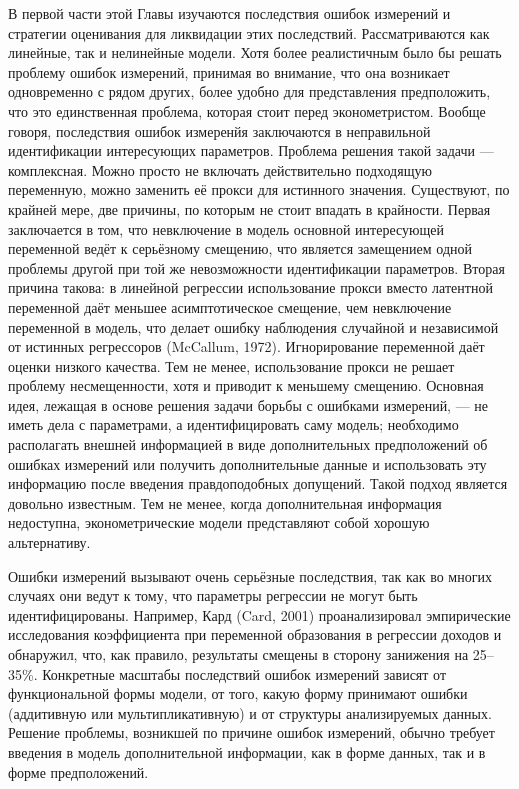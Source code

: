 В первой части этой Главы изучаются последствия ошибок измерений и стратегии оценивания для ликвидации этих последствий. Рассматриваются как линейные, так и нелинейные модели. Хотя более реалистичным было бы решать проблему ошибок измерений, принимая во внимание, что она возникает одновременно с рядом других, более удобно для представления предположить, что это единственная проблема, которая стоит перед эконометристом.
Вообще говоря, последствия ошибок измеренйя заключаются в неправильной идентификации интересующих параметров. Проблема решения такой задачи --- комплексная. Можно просто не включать действительно подходящую переменную, можно заменить её прокси для истинного значения. Существуют, по крайней мере, две причины, по которым не стоит впадать в крайности. Первая заключается в том, что невключение в модель основной интересующей переменной ведёт к серьёзному смещению, что является замещением одной проблемы другой при той же невозможности идентификации параметров. Вторая причина такова: в линейной регрессии использование прокси вместо латентной переменной даёт меньшее асимптотическое смещение, чем невключение переменной в модель, что делает ошибку наблюдения случайной и независимой от истинных регрессоров (McCallum, 1972). Игнорирование переменной даёт оценки низкого качества.  Тем не менее, использование прокси не решает проблему несмещенности, хотя и приводит к меньшему смещению.
Основная идея, лежащая в основе решения задачи борьбы с ошибками измерений, --- не иметь дела с параметрами, а идентифицировать саму модель; необходимо располагать внешней информацией в виде дополнительных предположений об ошибках измерений или получить дополнительные данные и использовать эту информацию после введения правдоподобных допущений. Такой подход является довольно известным. Тем не менее, когда дополнительная информация недоступна, эконометрические модели представляют собой хорошую альтернативу.

Ошибки измерений вызывают очень серьёзные последствия, так как во многих случаях они ведут к тому, что параметры регрессии не могут быть идентифицированы. Например, Кард (Card, 2001) проанализировал эмпирические исследования коэффициента при переменной образования в регрессии доходов и обнаружил, что, как правило, результаты смещены в сторону занижения на 25--35\%.  Конкретные масштабы последствий ошибок измерений зависят от функциональной формы модели, от того, какую форму принимают ошибки (аддитивную или мультипликативную) и от структуры анализируемых данных. Решение проблемы, возникшей по причине ошибок измерений, обычно требует введения в модель дополнительной информации, как в форме данных, так и в форме предположений.

